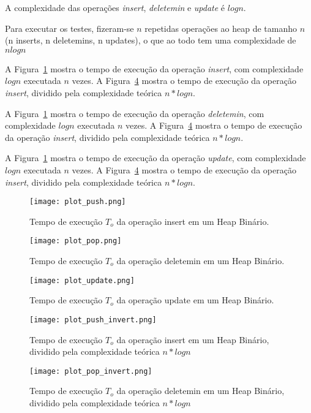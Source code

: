 \documentclass{article}
\begin{document}
A complexidade das operações \emph{insert}, \emph{deletemin} e \emph{update} é $ log n $.

Para executar os testes, fizeram-se $ n $ repetidas operações ao heap de tamanho $ n $ (n inserts, n deletemins, n updates), o que ao todo tem uma complexidade de $ n log n $

A Figura~\ref{fig3} mostra o tempo de execução da operação \emph{insert}, com complexidade $log n$ executada $n$ vezes. A Figura~\ref{fig6} mostra o tempo de execução da operação \emph{insert}, dividido pela complexidade teórica $n * log n$.

A Figura~\ref{fig3} mostra o tempo de execução da operação \emph{deletemin}, com complexidade $log n$ executada $n$ vezes. A Figura~\ref{fig6} mostra o tempo de execução da operação \emph{insert}, dividido pela complexidade teórica $n * log n$.

A Figura~\ref{fig3} mostra o tempo de execução da operação \emph{update}, com complexidade $log n$ executada $n$ vezes. A Figura~\ref{fig6} mostra o tempo de execução da operação \emph{insert}, dividido pela complexidade teórica $n * log n$.

\begin{figure}
  \centering
  \texttt{[image: plot\_push.png]}
  \caption{Tempo de execução $T_o$ da operação insert em um Heap Binário.}
  \label{fig3}
\end{figure}

\begin{figure}
  \centering
  \texttt{[image: plot\_pop.png]}
  \caption{Tempo de execução $T_o$ da operação deletemin em um Heap Binário.}
  \label{fig4}
\end{figure}

\begin{figure}
  \centering
  \texttt{[image: plot\_update.png]}
  \caption{Tempo de execução $T_o$ da operação update em um Heap Binário.}
  \label{fig5}
\end{figure}

\begin{figure}
  \centering
  \texttt{[image: plot\_push\_invert.png]}
  \caption{Tempo de execução $T_o$ da operação insert em um Heap Binário, dividido pela complexidade teórica $n * log n$}
  \label{fig6}
\end{figure}

\begin{figure}
  \centering
  \texttt{[image: plot\_pop\_invert.png]}
  \caption{Tempo de execução $T_o$ da operação deletemin em um Heap Binário, dividido pela complexidade teórica $n * log n$}
  \label{fig7}
\end{figure}
\end{document}
